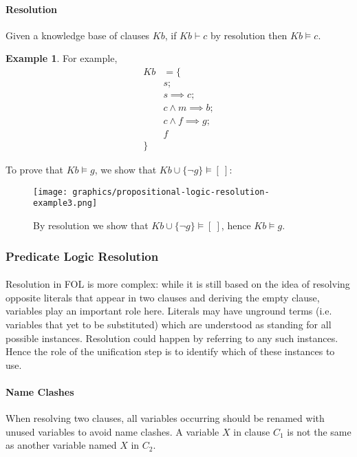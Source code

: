 \documentclass{article}
\theoremstyle{plain}
\theoremstyle{definition}
\newtheorem{exmp}[thm]{Example} %
\begin{document}
\begin{multicols}{2}
\paragraph{Resolution} Given a knowledge base of clauses $Kb$, if $Kb \vdash c$ by resolution then $Kb \models c$. 

\begin{exmp}For example,
\begin{align*}
Kb &= \{\\
	&s;\\
	&s \implies c;\\
	&c \land m \implies b;\\
	&c \land f \implies g;\\
	&f\\
	\}&
\end{align*}

\noindent To prove that $Kb \models g$, we show that $Kb \cup \{\lnot g\} \models [\ ]$:

\begin{figure}[H]
\centering
\texttt{[image: graphics/propositional-logic-resolution-example3.png]}
\caption{By resolution we show that $Kb \cup \{\lnot g\} \models [\ ]$, hence $Kb \models g$.}
\end{figure}\end{exmp}

\subsubsection{Predicate Logic Resolution}

\paragraph{} Resolution in FOL is more complex: while it is still based on the idea of resolving opposite literals that appear in two clauses and deriving the empty clause, variables play an important role here. Literals may have unground terms (i.e. variables that yet to be substituted) which are understood as standing for all possible instances. Resolution could happen by referring to any such instances. Hence the role of the unification step is to identify which of these instances to use.

\paragraph{Name Clashes} When resolving two clauses, all variables occurring should be renamed with unused variables to avoid name clashes. A variable $X$ in clause $C_1$ is not the same as another variable named $X$ in $C_2$.


\end{multicols}
\end{document}
